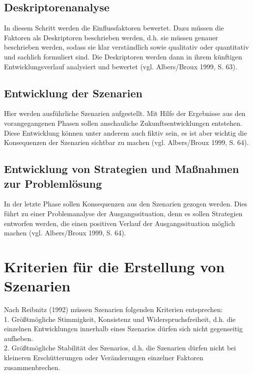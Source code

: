 \documentclass[12pt,a4paper]{article}
\begin{document}
\subsection{Deskriptorenanalyse} 
In diesem Schritt werden die Einflussfaktoren bewertet. Dazu müssen die Faktoren als Deskriptoren beschrieben werden, d.h. sie müssen genauer beschrieben werden, sodass sie klar verständlich sowie qualitativ oder quantitativ und sachlich formuliert sind. Die Deskriptoren werden dann in ihrem künftigen Entwicklungsverlauf analysiert und bewertet (vgl. Albers/Broux 1999, S. 63). 

\subsection{Entwicklung der Szenarien} 
Hier werden ausführliche Szenarien aufgestellt. Mit Hilfe der Ergebnisse aus den vorangegangenen Phasen sollen anschauliche Zukunftsentwicklungen entstehen. Diese Entwicklung können unter anderem auch fiktiv sein, es ist aber wichtig die Konsequenzen der Szenarien sichtbar zu machen (vgl. Albers/Broux 1999, S. 64). 

\subsection{Entwicklung von Strategien und Maßnahmen zur Problemlösung} 
In der letzte Phase sollen Konsequenzen aus den Szenarien gezogen werden. Dies führt zu einer Problemanalyse der Ausgangssituation, denn es sollen Strategien entworfen werden, die einen positiven Verlauf der Ausgangssituation möglich machen (vgl. Albers/Broux 1999, S. 64). 

\section{Kriterien für die Erstellung von Szenarien} 
Nach Reibnitz (1992)\cite{Reibnitz1992} müssen Szenarien folgenden Kriterien entsprechen: \\

1. Größtmögliche Stimmigkeit, Konsistenz und Widerspruchsfreiheit, d.h. die einzelnen Entwicklungen innerhalb eines Szenarios dürfen sich nicht gegenseitig aufheben.\\

2. Größtmögliche Stabilität des Szenarios, d.h. die Szenarien dürfen nicht bei kleineren Erschütterungen oder Veränderungen einzelner Faktoren zusammenbrechen. \\
\end{document}
